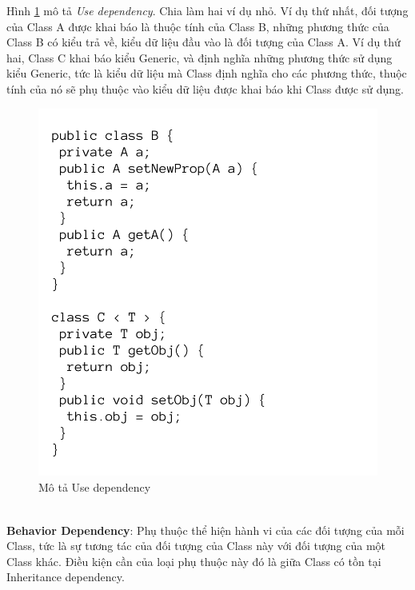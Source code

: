 \documentclass[12pt]{report}
\begin{document}
\noindent Hình \ref{fig:use_dependency} mô tả \textit{Use dependency}. Chia làm hai ví dụ nhỏ. Ví dụ thứ nhất, đối tượng của Class A được khai báo là thuộc tính của Class B, những phương thức của Class B có kiểu trả về, kiểu dữ liệu đầu vào là đối tượng của Class A. Ví dụ thứ hai, Class C khai báo kiểu Generic, và định nghĩa những phương thức sử dụng kiểu Generic, tức là kiểu dữ liệu mà Class định nghĩa cho các phương thức, thuộc tính của nó sẽ phụ thuộc vào kiểu dữ liệu được khai báo khi Class được sử dụng.
\begin{figure}[!htbp]
	\centering
	\vspace{-0.5cm}
	\includegraphics[scale=0.35]{images/use_dependency}
	\caption{Mô tả Use dependency}
	\label{fig:use_dependency}
\end{figure}
\\
\noindent \textbf{Behavior Dependency}: Phụ thuộc thể hiện hành vi của các đối tượng của mỗi Class, tức là sự tương tác của đối tượng của Class này với đối tượng của một Class khác. Điều kiện cần của loại phụ thuộc này đó là giữa Class có tồn tại Inheritance dependency.
\end{document}
